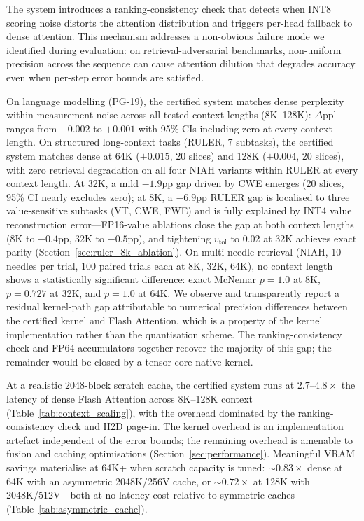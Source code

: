 \documentclass[11pt,a4paper]{article}
\theoremstyle{definition}
\theoremstyle{remark}
\begin{document}
The system introduces a ranking-consistency check that detects when INT8 scoring noise distorts the attention distribution and triggers per-head fallback to dense attention.  This mechanism addresses a non-obvious failure mode we identified during evaluation: on retrieval-adversarial benchmarks, non-uniform precision across the sequence can cause attention dilution that degrades accuracy even when per-step error bounds are satisfied.

On language modelling (PG-19), the certified system matches dense perplexity within measurement noise across all tested context lengths (8K--128K): $\Delta\mathrm{ppl}$ ranges from $-0.002$ to $+0.001$ with 95\% CIs including zero at every context length.  On structured long-context tasks (RULER, 7 subtasks), the certified system matches dense at 64K ($+0.015$, 20 slices) and 128K ($+0.004$, 20 slices), with zero retrieval degradation on all four NIAH variants within RULER at every context length.  At 32K, a mild $-1.9$pp gap driven by CWE emerges (20 slices, 95\% CI nearly excludes zero); at 8K, a $-6.9$pp RULER gap is localised to three value-sensitive subtasks (VT, CWE, FWE) and is fully explained by INT4 value reconstruction error---FP16-value ablations close the gap at both context lengths (8K to $-0.4$pp, 32K to $-0.5$pp), and tightening $v_{\mathrm{tol}}$ to 0.02 at 32K achieves exact parity (Section~\ref{sec:ruler_8k_ablation}).  On multi-needle retrieval (NIAH, 10 needles per trial, 100 paired trials each at 8K, 32K, 64K), no context length shows a statistically significant difference: exact McNemar $p{=}1.0$ at 8K, $p{=}0.727$ at 32K, and $p{=}1.0$ at 64K.  We observe and transparently report a residual kernel-path gap attributable to numerical precision differences between the certified kernel and Flash Attention, which is a property of the kernel implementation rather than the quantisation scheme.  The ranking-consistency check and FP64 accumulators together recover the majority of this gap; the remainder would be closed by a tensor-core-native kernel.

At a realistic 2048-block scratch cache, the certified system runs at $2.7\text{--}4.8\times$ the latency of dense Flash Attention across 8K--128K context (Table~\ref{tab:context_scaling}), with the overhead dominated by the ranking-consistency check and H2D page-in.  The kernel overhead is an implementation artefact independent of the error bounds; the remaining overhead is amenable to fusion and caching optimisations (Section~\ref{sec:performance}).  Meaningful VRAM savings materialise at 64K+ when scratch capacity is tuned: ${\sim}0.83\times$ dense at 64K with an asymmetric 2048K/256V cache, or ${\sim}0.72\times$ at 128K with 2048K/512V---both at no latency cost relative to symmetric caches (Table~\ref{tab:asymmetric_cache}).
\end{document}
